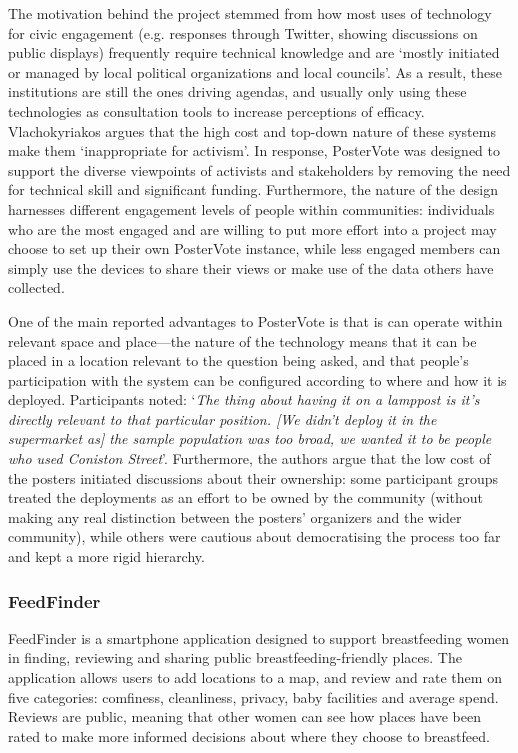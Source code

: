 The motivation behind the project stemmed from how most uses of technology for civic engagement (e.g. responses through Twitter, showing discussions on public displays) frequently require technical knowledge and are `mostly initiated or managed by local political organizations and local councils'. As a result, these institutions are still the ones driving agendas, and usually only using these technologies as consultation tools to increase perceptions of efficacy. Vlachokyriakos argues that the high cost and top-down nature of these systems make them `inappropriate for activism'. In response, PosterVote was designed to support the diverse viewpoints of activists and stakeholders by removing the need for technical skill and significant funding. Furthermore, the nature of the design harnesses different engagement levels of people within communities: individuals who are the most engaged and are willing to put more effort into a project may choose to set up their own PosterVote instance, while less engaged members can simply use the devices to share their views or make use of the data others have collected.

One of the main reported advantages to PosterVote is that is can operate within relevant space and place---the nature of the technology means that it can be placed in a location relevant to the question being asked, and that people's participation with the system can be configured according to where and how it is deployed. Participants noted: `\textit{The thing about having it on a lamppost is it's directly relevant to that particular position. [We didn't deploy it in the supermarket as] the sample population was too broad, we wanted it to be people who used Coniston Street}'. Furthermore, the authors argue that the low cost of the posters initiated discussions about their ownership: some participant groups treated the deployments as an effort to be owned by the community (without making any real distinction between the posters' organizers and the wider community), while others were cautious about democratising the process too far and kept a more rigid hierarchy. 

\subsubsection{FeedFinder}

FeedFinder \citep{Balaam2015} is a smartphone application designed to support breastfeeding women in finding, reviewing and sharing public breastfeeding-friendly places. The application allows users to add locations to a map, and review and rate them on five categories: comfiness, cleanliness, privacy, baby facilities and average spend. Reviews are public, meaning that other women can see how places have been rated to make more informed decisions about where they choose to breastfeed.

